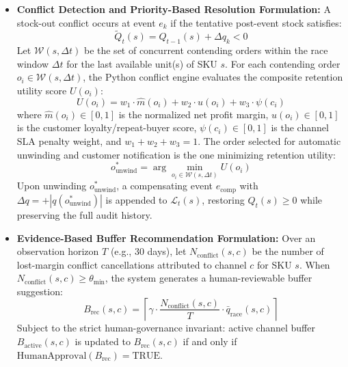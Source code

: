 \documentclass[oneside,a4paper,12pt]{report}
\begin{document}
\begin{itemize}
  \item \textbf{Conflict Detection and Priority-Based Resolution Formulation:}
  A stock-out conflict occurs at event $e_k$ if the tentative post-event stock satisfies:
  \begin{equation}
  \tilde{Q}_t(s) = Q_{t-1}(s) + \Delta q_k < 0
  \end{equation}
  Let $\mathcal{W}(s, \Delta t)$ be the set of concurrent contending orders within the race window $\Delta t$ for the last available unit(s) of SKU $s$. For each contending order $o_i \in \mathcal{W}(s, \Delta t)$, the Python conflict engine evaluates the composite retention utility score $U(o_i)$:
  \begin{equation}
  U(o_i) = w_1 \cdot \widehat{m}(o_i) + w_2 \cdot u(o_i) + w_3 \cdot \psi(c_i)
  \end{equation}
  where $\widehat{m}(o_i) \in [0,1]$ is the normalized net profit margin, $u(o_i) \in [0,1]$ is the customer loyalty/repeat-buyer score, $\psi(c_i) \in [0,1]$ is the channel SLA penalty weight, and $w_1 + w_2 + w_3 = 1$. The order selected for automatic unwinding and customer notification is the one minimizing retention utility:
  \begin{equation}
  o^*_{\text{unwind}} = \arg\min_{o_i \in \mathcal{W}(s, \Delta t)} U(o_i)
  \end{equation}
  Upon unwinding $o^*_{\text{unwind}}$, a compensating event $e_{\text{comp}}$ with $\Delta q = +|q(o^*_{\text{unwind}})|$ is appended to $\mathcal{L}_t(s)$, restoring $Q_t(s) \ge 0$ while preserving the full audit history.

  \item \textbf{Evidence-Based Buffer Recommendation Formulation:}
  Over an observation horizon $T$ (e.g., 30 days), let $N_{\text{conflict}}(s, c)$ be the number of lost-margin conflict cancellations attributed to channel $c$ for SKU $s$. When $N_{\text{conflict}}(s, c) \ge \theta_{\text{min}}$, the system generates a human-reviewable buffer suggestion:
  \begin{equation}
  B_{\text{rec}}(s, c) = \left\lceil \gamma \cdot \frac{N_{\text{conflict}}(s, c)}{T} \cdot \bar{q}_{\text{race}}(s, c) \right\rceil
  \end{equation}
  Subject to the strict human-governance invariant: active channel buffer $B_{\text{active}}(s, c)$ is updated to $B_{\text{rec}}(s, c)$ if and only if $\text{HumanApproval}(B_{\text{rec}}) = \text{TRUE}$.


\end{itemize}
\end{document}
